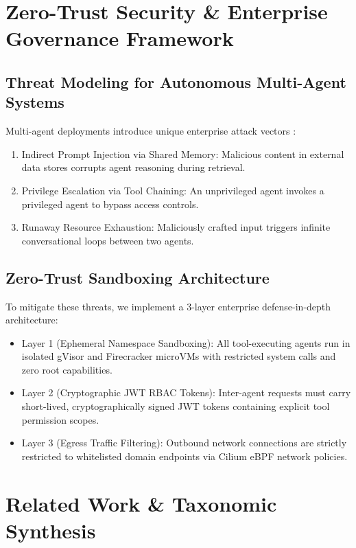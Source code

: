 \documentclass{article}
\begin{document}
\section{Zero-Trust Security \& Enterprise Governance Framework}



\subsection{Threat Modeling for Autonomous Multi-Agent Systems}


Multi-agent deployments introduce unique enterprise attack vectors \cite{arxiv_2404_04289}:
\begin{enumerate}
  \item Indirect Prompt Injection via Shared Memory: Malicious content in external data stores corrupts agent reasoning during retrieval.
  \item Privilege Escalation via Tool Chaining: An unprivileged agent invokes a privileged agent to bypass access controls.
  \item Runaway Resource Exhaustion: Maliciously crafted input triggers infinite conversational loops between two agents.
\end{enumerate}


\subsection{Zero-Trust Sandboxing Architecture}


To mitigate these threats, we implement a 3-layer enterprise defense-in-depth architecture:
\begin{itemize}
  \item Layer 1 (Ephemeral Namespace Sandboxing): All tool-executing agents run in isolated gVisor and Firecracker microVMs with restricted system calls and zero root capabilities.
  \item Layer 2 (Cryptographic JWT RBAC Tokens): Inter-agent requests must carry short-lived, cryptographically signed JWT tokens containing explicit tool permission scopes.
  \item Layer 3 (Egress Traffic Filtering): Outbound network connections are strictly restricted to whitelisted domain endpoints via Cilium eBPF network policies.
\end{itemize}




\section{Related Work \& Taxonomic Synthesis}
\end{document}
